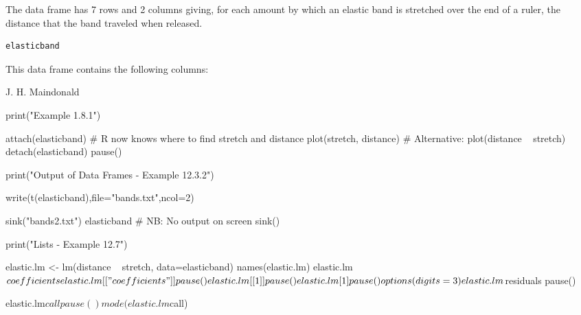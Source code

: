 \begin{Description}\relax
The  data frame has 7 rows and 2 columns
giving, for each amount by which an elastic band is stretched
over the end of a ruler, the distance that the band traveled when
released.
\end{Description}
\begin{Usage}
\begin{verbatim}elasticband\end{verbatim}
\end{Usage}
\begin{Format}\relax
This data frame contains the following columns:
\end{Format}
\begin{Source}\relax
J. H. Maindonald
\end{Source}
\begin{Examples}
\begin{ExampleCode}
print("Example 1.8.1")

attach(elasticband)     # R now knows where to find stretch and distance
plot(stretch, distance) # Alternative: plot(distance ~ stretch)
detach(elasticband)
pause()

print("Output of Data Frames - Example 12.3.2")

write(t(elasticband),file="bands.txt",ncol=2)

sink("bands2.txt")
elasticband   # NB: No output on screen
sink()

print("Lists - Example 12.7")

elastic.lm <- lm(distance ~ stretch, data=elasticband)
 names(elastic.lm)
 elastic.lm$coefficients
elastic.lm[["coefficients"]]
pause()

elastic.lm[[1]]
pause()

elastic.lm[1]
pause()

options(digits=3)
elastic.lm$residuals 
pause()

elastic.lm$call
pause()

 mode(elastic.lm$call)

\end{ExampleCode}
\end{Examples}

